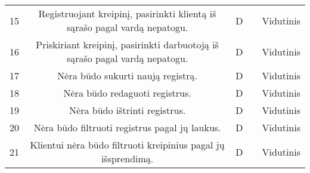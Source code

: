 \begin{table}[ht]
\begin{tabular}{c c c c c}
	15 & Registruojant kreipinį, pasirinkti klientą iš sąrašo pagal vardą nepatogu. & D & & Vidutinis\\%
	16 & Priskiriant kreipinį, pasirinkti darbuotoją iš sąrašo pagal vardą nepatogu. & D & & Vidutinis\\%
	17 & Nėra būdo sukurti naują registrą. & D & & Vidutinis\\%
	18 & Nėra būdo redaguoti registrus. & D & & Vidutinis\\%
	19 & Nėra būdo ištrinti registrus. & D & & Vidutinis\\%
	20 & Nėra būdo filtruoti registrus pagal jų laukus. & D & & Vidutinis\\%
	21 & Klientui nėra būdo filtruoti kreipinius pagal jų išsprendimą. & D & & Vidutinis\\%
	\hline %
	\end{tabular} 
	\label{table:defektai} %
	\end{table} 
